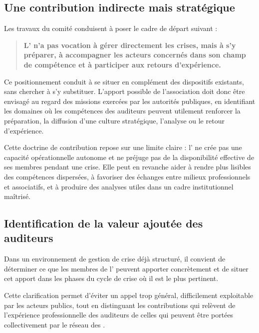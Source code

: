 \subsection{Une contribution indirecte mais stratégique}


Les travaux du comité conduisent à poser le cadre de départ suivant :

\begin{quote}
\textbf{L'\ARSeize{} n'a pas vocation à gérer directement les crises, mais à s'y préparer, à accompagner les acteurs concernés dans son champ de compétence et à participer aux retours d'expérience.}
\end{quote}


Ce positionnement conduit à se situer en complément des dispositifs existants, sans chercher à s'y substituer. L'apport possible de l'association doit donc être envisagé au regard des missions exercées par les autorités publiques, en identifiant les domaines où les compétences des auditeurs peuvent utilement renforcer la préparation, la diffusion d'une culture stratégique, l'analyse ou le retour d'expérience.

Cette doctrine de contribution repose sur une limite claire : l'\ARSeize{} ne crée pas une capacité opérationnelle autonome et ne préjuge pas de la disponibilité effective de ses membres pendant une crise. Elle peut en revanche aider à rendre plus lisibles des compétences dispersées, à favoriser des échanges entre milieux professionnels et associatifs, et à produire des analyses utiles dans un cadre institutionnel maîtrisé.

\subsection{Identification de la valeur ajoutée des auditeurs}


Dans un environnement de gestion de crise déjà structuré, il convient de déterminer ce que les membres de l'\ARSeize{} peuvent apporter concrètement et de situer cet apport dans les phases du cycle de crise où il est le plus pertinent.

Cette clarification permet d'éviter un appel trop général, difficilement exploitable par les acteurs publics, tout en distinguant les contributions qui relèvent de l'expérience professionnelle des auditeurs de celles qui peuvent être portées collectivement par le réseau des \AssociationsUnionIHEDN.


